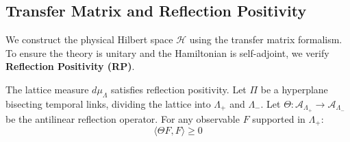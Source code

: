 \subsection{Transfer Matrix and Reflection Positivity}

We construct the physical Hilbert space $\mathcal{H}$ using the transfer matrix formalism. To ensure the theory is unitary and the Hamiltonian is self-adjoint, we verify \textbf{Reflection Positivity (RP)}.

\begin{theorem}
\label{thm:reflection-pos}
The lattice measure $d\mu_\Lambda$ satisfies reflection positivity. Let $\Pi$ be a hyperplane bisecting temporal links, dividing the lattice into $\Lambda_+$ and $\Lambda_-$. Let $\Theta: \mathcal{A}_{\Lambda_+} \to \mathcal{A}_{\Lambda_-}$ be the antilinear reflection operator. For any observable $F$ supported in $\Lambda_+$:
\begin{equation}
\langle \Theta F, F \rangle \ge 0
\end{equation}
\end{theorem}

